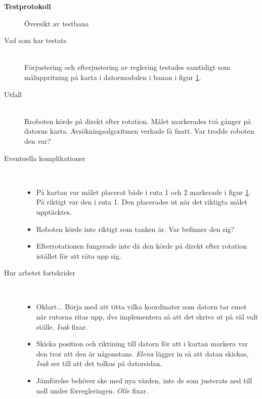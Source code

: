 \documentclass[11pt]{article}
\begin{document}
\begin{center}

{\Huge\bfseries Testprotokoll}
\vspace{4em}
\end{center}

\begin{flushleft}


\begin{figure}[htbp]
\centering
\noindent\resizebox{.4\linewidth}{!}{
	}
	\caption{Översikt av testbana\label{bana}}	
\end{figure}

\begin{description}
\item[Vad som har testats] \hfill \\
Förjustering och efterjustering av reglering testades samtidigt som måluppritning på karta i datormodulen i banan i figur \ref{bana}. 

\vspace{1em}
\item[Utfall] \hfill \\
Rroboten körde på direkt efter rotation. Målet markerades två gånger på datorns karta. Avsökningsalgoritmen verkade få fnatt. Var trodde roboten den var? 

\vspace{1em}
\item[Eventuella komplikationer] \hfill \\
\begin{itemize}
	\item På kartan var målet placerat både i ruta 1 och 2 markerade i figur \ref{bana}. På riktigt var den i ruta 1. Den placerades ut när det riktigta målet upptäcktes.
	\item Roboten körde inte riktigt som tanken är. Var befinner den sig?
	\item Efterrotationen fungerade inte då den körde på direkt efter rotation istället för att räta upp sig.
\end{itemize}

\vspace{1em}
\pagebreak
\item[Hur arbetet fortskrider] \hfill \\
\begin{itemize}
	\item Oklart... Börja med att titta vilka koordinater som datorn tar emot när rutorna ritas upp, dvs implementera så att det skrivs ut på väl valt ställe. \emph{Isak} fixar.
	\item Skicka position och riktining till datorn för att i kartan markera var den tror att den är någonstans. \emph{Elena} lägger in så att datan skickas, \emph{Isak} ser till att det tolkas på datorsidan.
	\item Jämförelse behöver ske med nya värden, inte de som justerats ned till noll under förregleringen. \emph{Olle} fixar.
\end{itemize}


\end{description}

\end{flushleft}
\end{document}
